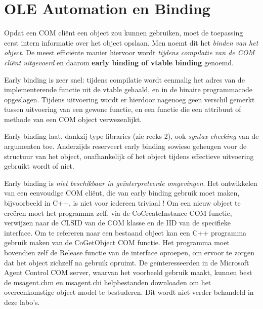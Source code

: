 \documentclass[11pt,a4paper]{report}
\begin{document}
\section{OLE Automation en Binding}
\par Opdat een COM cliënt een object zou kunnen gebruiken, moet de toepassing eerst intern informatie over het object opslaan. Men noemt dit het \textit{binden van het object}. De meest efficiënte manier hiervoor wordt \textit{tijdens compilatie van de COM cliënt uitgevoerd} en daarom \textbf{early binding of vtable binding} genoemd. 
\par Early binding is zeer snel: tijdens compilatie wordt eenmalig het adres van de implementerende functie uit de vtable gehaald, en in de binaire programmacode opgeslagen. Tijdens uitvoering wordt er hierdoor nagenoeg geen verschil gemerkt tussen uitvoering van een gewone functie, en een functie die een attribuut of methode van een COM object verwezenlijkt. 
\par Early binding laat, dankzij type libraries (zie reeks 2), ook \textit{syntax checking} van de argumenten toe. Anderzijds reserveert early binding sowieso geheugen voor de structuur van het object, onafhankelijk of het object tijdens effectieve uitvoering gebruikt wordt of niet. 
\par Early binding is \textit{niet beschikbaar in geïnterpreteerde omgevingen}. Het ontwikkelen van een eenvoudige COM cliënt, die van early binding gebruik moet maken, bijvoorbeeld in C++, is niet voor iedereen triviaal ! Om een nieuw object te creëren moet het programma zelf, via de CoCreateInstance COM functie, verwijzen naar de CLSID van de COM klasse en de IID van de specifieke interface. Om te refereren naar een bestaand object kan een C++ programma gebruik maken van de CoGetObject COM functie. Het programma moet bovendien zelf de Release functie van de interface oproepen, om ervoor te zorgen dat het object zichzelf na gebruik opruimt. De geïnteresseerden in de Microsoft Agent Control COM server, waarvan het voorbeeld gebruik maakt, kunnen best de msagent.chm en msagent.chi helpbestanden downloaden om het overeenkomstige object model te bestuderen. Dit wordt niet verder behandeld in deze labo's.
\end{document}
